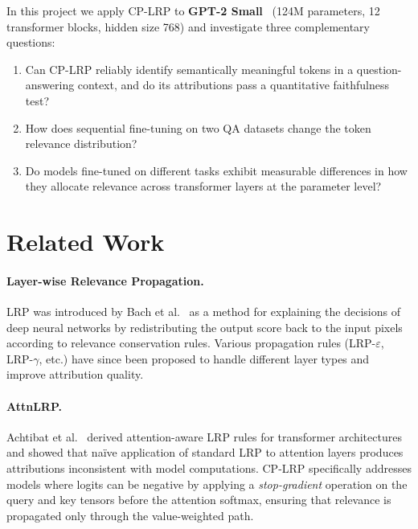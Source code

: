 \documentclass[10pt,twocolumn,letterpaper]{article}
\begin{document}
In this project we apply CP-LRP to \textbf{GPT-2 Small}~\cite{radford2019gpt2}
(124M parameters, 12 transformer blocks, hidden size 768) and investigate three
complementary questions:
\begin{enumerate}[leftmargin=*, itemsep=0pt, topsep=2pt]
  \item Can CP-LRP reliably identify semantically meaningful tokens in a
        question-answering context, and do its attributions pass a quantitative
        faithfulness test?
  \item How does sequential fine-tuning on two QA datasets change the token
        relevance distribution?
  \item Do models fine-tuned on different tasks exhibit measurable differences
        in how they allocate relevance across transformer layers at the
        parameter level?
\end{enumerate}

\section{Related Work}
\label{sec:related}

\paragraph{Layer-wise Relevance Propagation.}
LRP was introduced by Bach et al.~\cite{bach2015pixel} as a method for
explaining the decisions of deep neural networks by redistributing the output
score back to the input pixels according to relevance conservation rules.
Various propagation rules (LRP-$\varepsilon$, LRP-$\gamma$, etc.) have since
been proposed to handle different layer types and improve attribution quality.

\paragraph{AttnLRP.}
Achtibat et al.~\cite{achtibat2024attnlrp} derived attention-aware LRP rules
for transformer architectures and showed that na\"ive application of standard
LRP to attention layers produces attributions inconsistent with model
computations.
CP-LRP specifically addresses models where logits can be negative by applying a
\emph{stop-gradient} operation on the query and key tensors before the
attention softmax, ensuring that relevance is propagated only through the
value-weighted path.
\end{document}
